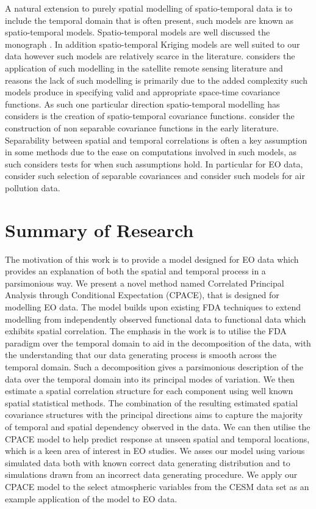 A natural extension to purely spatial modelling of spatio-temporal data is to include the temporal domain that is often present, such models are known as spatio-temporal models.
Spatio-temporal models are well discussed the monograph \cite{cressie_statistics_2011}.
In addition spatio-temporal Kriging models are well suited to our data however such models are relatively scarce in the literature.
\cite{militino_introduction_2018} considers the application of such modelling in the satellite remote sensing literature and reasons the lack of such modelling is primarily due to the added complexity such models produce in specifying valid and appropriate space-time covariance functions.
As such one particular direction spatio-temporal modelling has considers is the creation of spatio-temporal covariance functions.
\cite{cressie_classes_1999, gneiting_nonseparable_2002, iaco_nonseparable_2002} consider the construction of non separable covariance functions in the early literature.
Separability between spatial and temporal correlations is often a key assumption in some methods due to the ease on computations involved in such models, as such \cite{mitchell_likelihood_2006, fuentes_testing_2006, aston_tests_2017} considers tests for when such assumptions hold.
In particular for EO data, \cite{george_selecting_2015} consider such selection of separable covariances and \cite{deb_spatio-temporal_2017} consider such models for air pollution data. 

\section{\label{sec:summary_research}Summary of Research}
The motivation of this work is to provide a model designed for EO data which provides an explanation of both the spatial and temporal process in a parsimonious way.
We present a novel method named Correlated Principal Analysis through Conditional Expectation (CPACE), that is designed for modelling EO data.
The model builds upon existing FDA techniques to extend modelling from independently observed functional data to functional data which exhibits spatial correlation.
The emphasis in the work is to utilise the FDA paradigm over the temporal domain to aid in the decomposition of the data, with the understanding that our data generating process is smooth across the temporal domain.
Such a decomposition gives a parsimonious description of the data over the temporal domain into its principal modes of variation.
We then estimate a spatial correlation structure for each component using well known spatial statistical methods.
The combination of the resulting estimated spatial covariance structures with the principal directions aims to capture the majority of temporal and spatial dependency observed in the data.
We can then utilise the CPACE model to help predict response at unseen spatial and temporal locations, which is a keen area of interest in EO studies.
We asses our model using various simulated data both with known correct data generating distribution and to simulations drawn from an incorrect data generating procedure.
We apply our CPACE model to the select atmospheric variables from the CESM data set as an example application of the model to EO data.

